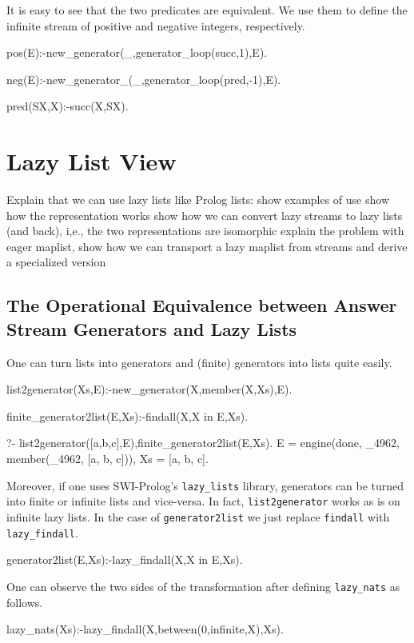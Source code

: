 \documentclass{new_tlp}
\begin{document}
It is easy to see that the two predicates are equivalent. We use
them to define the infinite stream of positive and negative 
integers, respectively.
\begin{code}
pos(E):-new_generator(_,generator_loop(succ,1),E).

neg(E):-new_generator_(_,generator_loop(pred,-1),E).

pred(SX,X):-succ(X,SX).
\end{code}

\section{Lazy List View}

   Explain that we can use lazy lists like Prolog lists:
   \BI
   \I
    show examples of use
   \I show how the representation works
   \I show how we can convert lazy streams to lazy lists (and back), i,e., the two representations are isomorphic
   \I explain the problem with eager maplist, show how we can transport a lazy maplist from streams and derive a specialized version
   \EI
   
\subsection{The Operational Equivalence between Answer Stream Generators and Lazy Lists}

One can turn lists into generators and (finite) generators into lists quite easily.
\begin{code}
list2generator(Xs,E):-new_generator(X,member(X,Xs),E).

finite_generator2list(E,Xs):-findall(X,X in E,Xs).
\end{code}

\BX
\begin{codex}
?- list2generator([a,b,c],E),finite_generator2list(E,Xs).
E = engine(done, _4962, member(_4962, [a, b, c])),
Xs = [a, b, c].
\end{codex}
\EX

Moreover, if one uses SWI-Prolog's {\tt lazy\_lists} library, generators can be turned into finite or infinite lists and vice-versa.
In fact, {\tt list2generator} works as is on infinite lazy lists. In the case of {\tt generator2list} we just replace {\tt findall} with {\tt lazy\_findall}.
\begin{code}
generator2list(E,Xs):-lazy_findall(X,X in E,Xs).
\end{code} 

One can observe the two sides of the transformation after defining {\tt lazy\_nats} as follows.
\begin{code}
lazy_nats(Xs):-lazy_findall(X,between(0,infinite,X),Xs).
\end{code}
\end{document}
